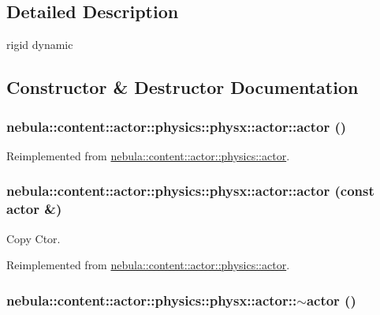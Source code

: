 \subsection{Detailed Description}
rigid dynamic 

\subsection{Constructor \& Destructor Documentation}
\hypertarget{classnebula_1_1content_1_1actor_1_1physics_1_1physx_1_1actor_a0c92cb495a7ea1aa8149b2b5adb48cf5}{
\subsubsection[{actor}]{\setlength{\rightskip}{0pt plus 5cm}nebula::content::actor::physics::physx::actor::actor ()}}
\label{classnebula_1_1content_1_1actor_1_1physics_1_1physx_1_1actor_a0c92cb495a7ea1aa8149b2b5adb48cf5}


Reimplemented from \hyperlink{classnebula_1_1content_1_1actor_1_1physics_1_1actor_ad2ad80fbd3fc6f628237daecfbc52d1b}{nebula::content::actor::physics::actor}.\hypertarget{classnebula_1_1content_1_1actor_1_1physics_1_1physx_1_1actor_a2c0d5d6e23d179c31263def0ccabc522}{
\subsubsection[{actor}]{\setlength{\rightskip}{0pt plus 5cm}nebula::content::actor::physics::physx::actor::actor (const {\bf actor} \&)}}
\label{classnebula_1_1content_1_1actor_1_1physics_1_1physx_1_1actor_a2c0d5d6e23d179c31263def0ccabc522}


Copy Ctor. 

Reimplemented from \hyperlink{classnebula_1_1content_1_1actor_1_1physics_1_1actor_aa0b3c24e555325f39a3a9651fed886ca}{nebula::content::actor::physics::actor}.\hypertarget{classnebula_1_1content_1_1actor_1_1physics_1_1physx_1_1actor_a27fa6e8ccfa32302ebfc2c44f27cb243}{
\subsubsection[{$\sim$actor}]{\setlength{\rightskip}{0pt plus 5cm}nebula::content::actor::physics::physx::actor::$\sim$actor ()}}
\label{classnebula_1_1content_1_1actor_1_1physics_1_1physx_1_1actor_a27fa6e8ccfa32302ebfc2c44f27cb243}


